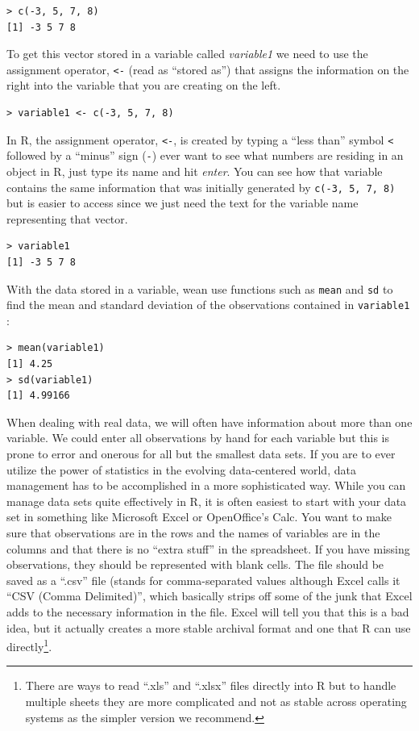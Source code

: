 \documentclass[]{book}
\let\rmarkdownfootnote\footnote%
\def\footnote{\protect\rmarkdownfootnote}
\begin{document}
\begin{verbatim}
> c(-3, 5, 7, 8)
[1] -3 5 7 8
\end{verbatim}

To get this vector stored in a variable called \emph{variable1} we need
to use the assignment operator, \texttt{\textless{}-} (read as ``stored
as'') that assigns the information on the right into the variable that
you are creating on the left.

\begin{verbatim}
> variable1 <- c(-3, 5, 7, 8)
\end{verbatim}

In R, the assignment operator, \texttt{\textless{}-}, is created by
typing a ``less than'' symbol \texttt{\textless{}} followed by a
``minus'' sign (\texttt{-}) ever want to see what numbers are residing
in an object in R, just type its name and hit \emph{enter}. You can see
how that variable contains the same information that was initially
generated by \texttt{c(-3,\ 5,\ 7,\ 8)} but is easier to access since we
just need the text for the variable name representing that vector.

\begin{verbatim}
> variable1
[1] -3 5 7 8
\end{verbatim}

With the data stored in a variable, wean use functions such as
\texttt{mean} and \texttt{sd} to find the mean and standard deviation of
the observations contained in \texttt{variable1} :

\begin{verbatim}
> mean(variable1)
[1] 4.25
> sd(variable1)
[1] 4.99166
\end{verbatim}

When dealing with real data, we will often have information about more
than one variable. We could enter all observations by hand for each
variable but this is prone to error and onerous for all but the smallest
data sets. If you are to ever utilize the power of statistics in the
evolving data-centered world, data management has to be accomplished in
a more sophisticated way. While you can manage data sets quite
effectively in R, it is often easiest to start with your data set in
something like Microsoft Excel or OpenOffice's Calc. You want to make
sure that observations are in the rows and the names of variables are in
the columns and that there is no ``extra stuff'' in the spreadsheet. If
you have missing observations, they should be represented with blank
cells. The file should be saved as a ``.csv'' file (stands for
comma-separated values although Excel calls it ``CSV (Comma
Delimited)'', which basically strips off some of the junk that Excel
adds to the necessary information in the file. Excel will tell you that
this is a bad idea, but it actually creates a more stable archival
format and one that R can use directly\footnote{There are ways to read
  ``.xls'' and ``.xlsx'' files directly into R but to handle multiple
  sheets they are more complicated and not as stable across operating
  systems as the simpler version we recommend.}.
\end{document}
